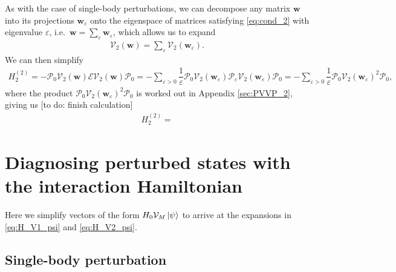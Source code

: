 \documentclass[nofootinbib,notitlepage,11pt]{revtex4-2}
\newcommand{\f}[2]{\dfrac{#1}{#2}} %
\newcommand{\p}[1]{\left(#1\right)} %
\newcommand{\m}{\bm} %
\newcommand{\1}{\mathds{1}}
\newcommand{\e}{\varepsilon}
\newcommand{\E}{\mathcal{E}}
\renewcommand{\P}{\mathcal{P}}
\newcommand{\V}{\mathcal{V}}
\newcommand{\red}[1]{{\color{red} #1}}
\begin{document}
As with the case of single-body perturbations, we can decompose any
matrix $\m w$ into its projections $\m w_\e$ onto the eigenspace of
matrices satisfying \eqref{eq:cond_2} with eigenvalue $\e$,
i.e.~$\m w=\sum_\e\m w_\e$, which allows us to expand
\begin{align}
  \V_2\p{\m w} = \sum_\e \V_2\p{\m w_\e}.
\end{align}
We can then simplify
\begin{align}
  H_2^{(2)} = - \P_0 \V_2\p{\m w} \E \V_2\p{\m w} \P_0
  = -\sum_{\e>0} \f1\e \P_0 \V_2\p{\m w_\e} \P_\e \V_2\p{\m w_\e} \P_0
  = -\sum_{\e>0} \f1\e \P_0 \V_2\p{\m w_\e}^2 \P_0,
\end{align}
where the product $\P_0 \V_2\p{\m w_\e}^2 \P_0$ is worked out in
Appendix \ref{sec:PVVP_2}, giving us \red{[to do: finish calculation]}
\begin{align}
  H_2^{(2)} =
\end{align}

\vspace{3cm}

\appendix

\section{Diagnosing perturbed states with the interaction Hamiltonian}

Here we simplify vectors of the form $H_0\V_M\ket\psi$ to arrive at
the expansions in \eqref{eq:H_V1_psi} and \eqref{eq:H_V2_psi}.

\subsection{Single-body perturbation}
\label{sec:H_V1_psi}
\end{document}
